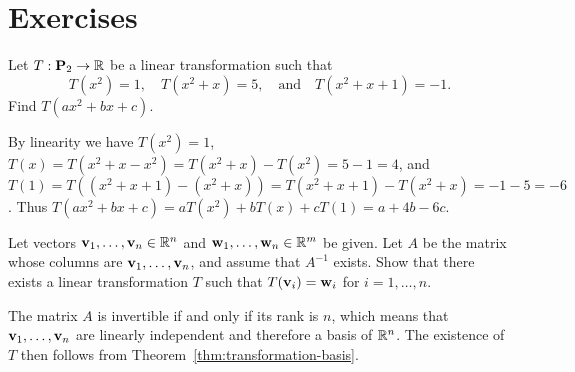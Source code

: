 \section*{Exercises}

\begin{ex}
  Let $T:\mathbf{P}_2 \to \mathbb{R}$ be a linear transformation such that
  \begin{equation*}
    T(x^2)=1,
    \quad
    T(x^2+x)=5,
    \quad\mbox{and}\quad
    T(x^2+x+1)=-1.
  \end{equation*}
  Find $T(ax^2+bx+c)$.
  \begin{sol}
    By linearity we have
    $T(x^2)=1$, $T(x) = T(x^2+x - x^2)= T(x^2+x) - T(x^2)= 5-1=4$, and
    $T(1) = T((x^2+x+1)-(x^2+x))=T(x^2+x+1)-T(x^2+x)= -1-5=-6$.
    Thus $T(ax^2+bx+c) = aT(x^2) + bT(x) + cT(1) = a+4b-6c$.
  \end{sol}
\end{ex}

\begin{ex}
  Let vectors $\vect{v}_1,\ldots,\vect{v}_n\in\R^n$ and
  $\vect{w}_1,\ldots,\vect{w}_n\in\R^m$ be given. Let $A$ be the
  matrix whose columns are $\vect{v}_1,\ldots,\vect{v}_n$, and assume
  that $A^{-1}$ exists. Show that there exists a linear transformation
  $T$ such that $T(\vect{v}_i)=\vect{w}_i$ for $i=1,\ldots,n$.
  \begin{sol}
    The matrix $A$ is invertible if and only if its rank is $n$, which
    means that $\vect{v}_1,\ldots,\vect{v}_n$ are linearly independent
    and therefore a basis of $\mathbb{R}^n$. The existence of $T$ then follows
    from Theorem~\ref{thm:transformation-basis}.
  \end{sol}
\end{ex}

